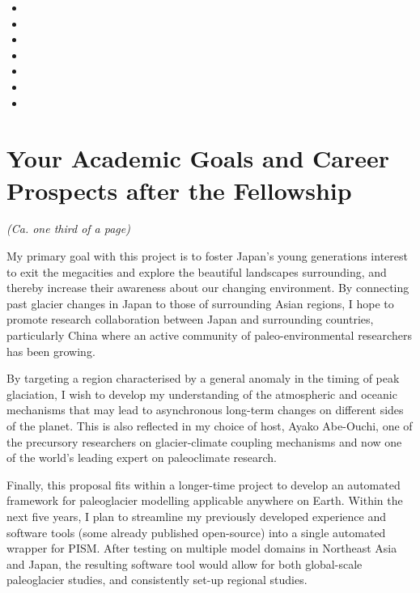 \documentclass{article}
\begin{document}
    \begin{itemize}
      \item{}
      \item{}
      \item{}
      \item{}
      \item{}
      \item{}
      \item{}
    \end{itemize}


\section{Your Academic Goals and Career Prospects after the Fellowship}

    \emph{(Ca. one third of a page)}

    My primary goal with this project is to foster Japan's young generations
    interest to exit the megacities and explore the beautiful landscapes
    surrounding, and thereby increase their awareness about our changing
    environment. By connecting past glacier changes in Japan to those of
    surrounding Asian regions, I hope to promote research collaboration between
    Japan and surrounding countries, particularly China where an active
    community of paleo-environmental researchers has been growing.

    By targeting a region characterised by a general anomaly in the timing of
    peak glaciation, I wish to develop my understanding of the atmospheric and
    oceanic mechanisms that may lead to asynchronous long-term changes on
    different sides of the planet. This is also reflected in my choice of host,
    Ayako Abe-Ouchi, one of the precursory researchers on glacier-climate
    coupling mechanisms and now one of the world's leading expert on
    paleoclimate research.

    Finally, this proposal fits within a longer-time project to develop an
    automated framework for paleoglacier modelling applicable anywhere on
    Earth. Within the next five years, I plan to streamline my previously
    developed experience and software tools (some already published
    open-source) into a single automated wrapper for PISM. After testing on
    multiple model domains in Northeast Asia and Japan, the resulting software
    tool would allow for both global-scale paleoglacier studies, and
    consistently set-up regional studies.


\end{document}
